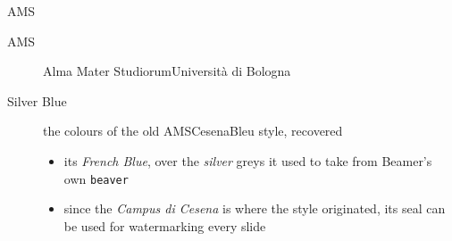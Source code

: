 \begin{frame}[c]{AMS}
%
\begin{description}
	\item[AMS] Alma Mater Studiorum\textendash{}Università di Bologna
	\item[Silver Blue] the colours of the old \alert{AMSCesenaBleu} style, recovered
	\begin{itemize}
		\item its \textcolor{sbblue}{\textit{French Blue}}, over the \textcolor{sbgreymid}{\textit{silver}} greys it used to take from Beamer's own \texttt{beaver}
		\item since the \emph{Campus di Cesena} is where the style originated, its seal can be used for watermarking every slide
	\end{itemize}
\end{description}
%
\end{frame}
